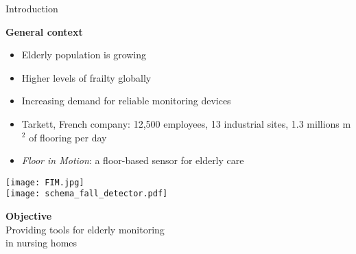 \begin{frame}{Introduction}
\begin{minipage}[t]{0.48\linewidth}
    \vspace{0pt}
        \centering\textbf{General context}
        \begin{itemize}
            \item Elderly population is growing
            \item Higher levels of frailty globally
            \item Increasing demand for reliable monitoring devices
            \item Tarkett, French company: 12,500 employees, 13 industrial sites, 1.3 millions m$^2$ of flooring per day
            \item \emph{Floor in Motion}: a floor-based sensor for elderly care
        \end{itemize}
            \smallskip
            \texttt{[image: FIM.jpg]}\\[2pt]
            \texttt{[image: schema\_fall\_detector.pdf]}\\
    \pause \pause
\end{minipage}\hfill
\begin{minipage}[t]{0.47\linewidth}
        \vspace{0pt}
        \centering\textbf{Objective}\\
        \smallskip
        {\textcolor{myblue}{Providing tools for elderly monitoring\\ in nursing homes}}
    

\end{minipage}
\end{frame}
